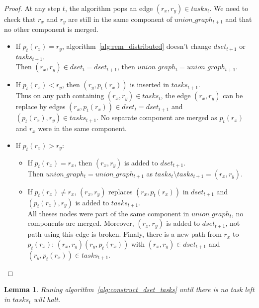\documentclass[12px]{article}
\newtheorem{lemma}[theorem]{Lemma}
\begin{document}
        \begin{proof}
          At any step $t$, the algorithm pops an edge $(r_x, r_y) \in tasks_t$. We need to check that $r_x$ and $r_y$ are still in the same component of $union\_graph_{t+1}$ and that no other component is merged.
          \begin{itemize}
            \item If $p_t(r_x) = r_y$, algorithm~\ref{alg:rem_distributed} doesn't change $dset_{t+1}$ or $tasks_{t+1}$. \\
              Then $(r_x, r_y) \in dset_t = dset_{t+1}$, then $union\_graph_t = union\_graph_{t+1}$.

            \item If $p_t(r_x) < r_y$, then $(r_y, p_t(r_x))$ is inserted in $tasks_{t+1}$. \\
              Thus on any path containing $(r_x, r_y) \in tasks_t$, the edge $(r_x, r_y)$ can be replace by edges $(r_x, p_t(r_x)) \in dset_t = dset_{t+1}$ and $(p_t(r_x), r_y) \in tasks_{t+1}$. No separate component are merged as $p_t(r_x)$ and $r_x$ were in the same component.

            \item If $p_t(r_x) > r_y$:
            \begin{itemize}
              \item If $p_t(r_x) = r_x$, then $(r_x, r_y)$ is added to $dset_{t+1}$. \\
                Then $union\_graph_t = union\_graph_{t+1}$ as $tasks_t \setminus tasks_{t+1} = {(r_x, r_y)}$.
              \item If $p_t(r_x) \neq r_x$, $(r_x, r_y)$ replaces $(r_x, p_t(r_x))$ in $dset_{t+1}$ and $(p_t(r_x), r_y)$ is added to $tasks_{t+1}$. \\
                All theses nodes were part of the same component in $union\_graph_t$, no components are merged. Moreover, $(r_x, r_y)$ is added to $dset_{t+1}$, not path using this edge is broken. Finaly, there is a new path from $r_x$ to $p_t(r_x)$: $(r_x, r_y)(r_y, p_t(r_x))$ with $(r_x, r_y) \in dset_{t+1}$ and $(r_y, p_t(r_x)) \in tasks_{t+1}$.
            \end{itemize}
          \end{itemize}
        \end{proof}

        \begin{lemma}%
          \label{lemma:halt}
          Runing algorithm~\ref{alg:construct_dset_tasks} until there is no task left in $tasks_t$ will halt.
        \end{lemma}
\end{document}

